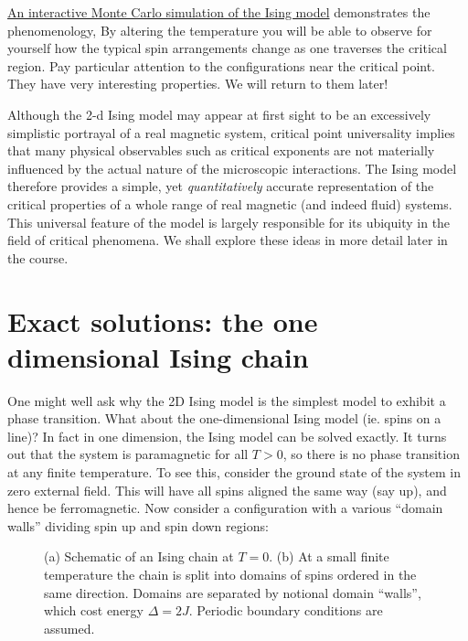 \documentclass[
  letterpaper,
  enabledeprecatedfontcommands]{report}
\begin{document}
\href{https://physics.weber.edu/schroeder/software/demos/isingmodel.html}{An
interactive Monte Carlo simulation of the Ising model} demonstrates the
phenomenology, By altering the temperature you will be able to observe
for yourself how the typical spin arrangements change as one traverses
the critical region. Pay particular attention to the configurations near
the critical point. They have very interesting properties. We will
return to them later!

Although the 2-d Ising model may appear at first sight to be an
excessively simplistic portrayal of a real magnetic system, critical
point universality implies that many physical observables such as
critical exponents are not materially influenced by the actual nature of
the microscopic interactions. The Ising model therefore provides a
simple, yet \emph{quantitatively} accurate representation of the
critical properties of a whole range of real magnetic (and indeed fluid)
systems. This universal feature of the model is largely responsible for
its ubiquity in the field of critical phenomena. We shall explore these
ideas in more detail later in the course.

\section{Exact solutions: the one dimensional Ising
chain}\label{exact-solutions-the-one-dimensional-ising-chain}

One might well ask why the 2D Ising model is the simplest model to
exhibit a phase transition. What about the one-dimensional Ising model
(ie. spins on a line)? In fact in one dimension, the Ising model can be
solved exactly. It turns out that the system is paramagnetic for all
\(T>0\), so there is no phase transition at any finite temperature. To
see this, consider the ground state of the system in zero external
field. This will have all spins aligned the same way (say up), and hence
be ferromagnetic. Now consider a configuration with a various ``domain
walls'' dividing spin up and spin down regions:

\begin{figure}


\caption{\label{fig-isingchain}(a) Schematic of an Ising chain at
\(T=0\). (b) At a small finite temperature the chain is split into
domains of spins ordered in the same direction. Domains are separated by
notional domain ``walls'', which cost energy \(\Delta=2J\). Periodic
boundary conditions are assumed.}

\end{figure}%
\end{document}
